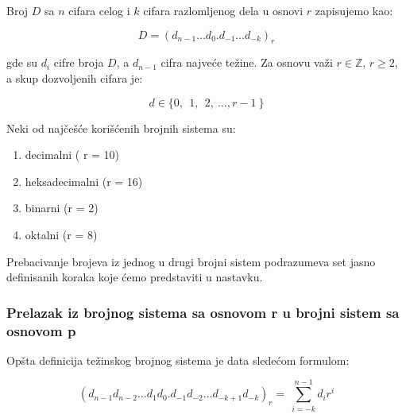 \documentclass[a4paper,11pt]{article}
\numberwithin{equation}{section}
\begin{document}
Broj $D$ sa $n$ cifara celog i $k$ cifara razlomljenog dela u osnovi $r$ zapisujemo kao:

\begin{equation}\label{eq:zapis}
D=(d_{n-1}\dots d_0.d_{-1}\dots d_{-k})_r
\end{equation}


gde su $d_i$ cifre broja $D$, a $d_{n-1}$ cifra najveće težine. Za osnovu važi $r\in\mathbb{Z}$, $r\ge2$, a skup dozvoljenih cifara je:

\begin{equation}\label{eq:1.1.1.1}
d \in \{ 0,\ \ 1,\ \ 2,\ \ldots,r - 1\ \}
\end{equation}


Neki od najčešće korišćenih brojnih sistema su:



\begin{enumerate}[label=\alph*),start=1,leftmargin=*]
\item decimalni ( r = 10)

\item heksadecimalni (r = 16)

\item binarni (r = 2)

\item oktalni (r = 8)

\end{enumerate}


Prebacivanje brojeva iz jednog u drugi brojni sistem podrazumeva set jasno definisanih koraka koje ćemo predstaviti u nastavku.



\subsubsection{Prelazak iz brojnog sistema sa osnovom r u brojni sistem sa osnovom p}\label{sec:1.1.1}


Opšta definicija težinskog brojnog sistema je data sledećom formulom:



\begin{equation}\label{eq:1.1.1.2}
{(d_{n - 1}d_{n - 2}\ldots d_{1}d_{0}.d_{- 1}d_{- 2}\ldots d_{- k + 1}d_{- k})}_{r} = \ \sum_{i = - k}^{n - 1}{d_{i}r^{i}}
\end{equation}
\end{document}
